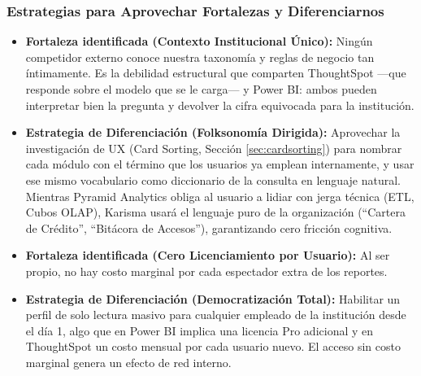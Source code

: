 \subsubsection{Estrategias para Aprovechar Fortalezas y Diferenciarnos}
\begin{itemize}
    \item \textbf{Fortaleza identificada (Contexto Institucional Único):} Ningún competidor externo conoce nuestra taxonomía y reglas de negocio tan íntimamente. Es la debilidad estructural que comparten ThoughtSpot —que responde sobre el modelo que se le carga— y Power BI: ambos pueden interpretar bien la pregunta y devolver la cifra equivocada para la institución.
    \item \textbf{Estrategia de Diferenciación (Folksonomía Dirigida):} Aprovechar la investigación de UX (Card Sorting, Sección \ref{sec:cardsorting}) para nombrar cada módulo con el término que los usuarios ya emplean internamente, y usar ese mismo vocabulario como diccionario de la consulta en lenguaje natural. Mientras Pyramid Analytics obliga al usuario a lidiar con jerga técnica (ETL, Cubos OLAP), Karisma usará el lenguaje puro de la organización (``Cartera de Crédito'', ``Bitácora de Accesos''), garantizando cero fricción cognitiva.
    \item \textbf{Fortaleza identificada (Cero Licenciamiento por Usuario):} Al ser propio, no hay costo marginal por cada espectador extra de los reportes.
    \item \textbf{Estrategia de Diferenciación (Democratización Total):} Habilitar un perfil de solo lectura masivo para cualquier empleado de la institución desde el día 1, algo que en Power BI implica una licencia Pro adicional y en ThoughtSpot un costo mensual por cada usuario nuevo. El acceso sin costo marginal genera un efecto de red interno.
\end{itemize}
